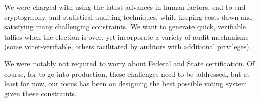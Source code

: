 We were charged with using the latest advances in human factors,
end-to-end cryptography, and statistical auditing techniques, while
keeping costs down and satisfying many challenging constraints.
We want to generate quick, verifiable tallies when the election is
over, yet incorporate a variety of audit mechanisms (some
voter-verifiable, others facilitated by auditors with additional
privileges). 

We were notably not required to worry about Federal and State
certification. Of course, for \projname to go into production, these
challenges need to be addressed, but at least for now, our focus
has been on designing the best possible voting system given these
constraints.


